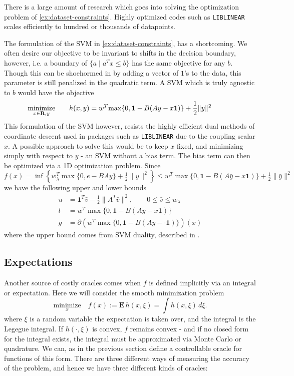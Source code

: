 \begin{example} There is a large amount of research
which goes into solving the optimization problem of \eqref{ex:dataset-constraints}.
Highly optimized codes such as {\tt LIBLINEAR} \cite{REF08a} scales efficiently to hundred or thousands of
datapoints. 

The formulation of the SVM in  \eqref{ex:dataset-constraints}, has a shortcoming.
We often desire our objective to be invariant to shifts in the
decision boundary, however, i.e. a boundary of $\{ a \mid a^Tx \leq b \}$ has the same
objective for any $b$. Though this can be shoehormed in by adding a vector of $1$'s to the data, 
this parameter is still penalized in the quadratic term. A SVM which is truly agnostic
to $b$ would have the objective
$$
\underset{x\in \mathbf{R} ,y}{\mbox{minimize}}\qquad h(x,y) = w^{T}\!\max\{0,\mathbf{1}-B(Ay - x\mathbf{1})\}+\frac{1}{2}\|y\|^{2}
\qquad \quad$$
This formulation of the SVM however, resists the highly efficient dual methods
of coordinate descent used in packages such as {\tt LIBLINEAR} \cite{REF08a}
due to the coupling scalar $x$. A possible approach to solve this
would be to keep $x$ fixed, and minimizing simply with respect to $y$ - an SVM
without a bias term. The bias term can then be optimized via a 1D optimization
problem. Since
$$
f(x)=\inf\left\{ w_{\lambda}^{T}\max\{0,e-BAy\}+\tfrac{1}{2}\|y\|^{2}\right\} \leq w^{T}\!\max\{0,\mathbf{1}-B(A\bar{y}-x\mathbf{1})\}+\tfrac{1}{2}\|\bar{y}\|^{2}
$$
we have the following upper and lower bounds
\begin{align*}
u & =\mathbf{1}^{T}\bar{v}-\tfrac{1}{2}\|A^{T}\bar{v}\|^{2},\qquad0\leq\bar{{v}}\leq w_{\lambda}\\
l & =w^{T}\!\max\{0,\mathbf{1}-B(A\bar{y}-x\mathbf{1})\}\\
g & =\partial(w^{T}\!\max\{0,\mathbf{1}-B(A\bar{y}-\cdot\mathbf{1})\})(x)
\end{align*}
where the upper bound comes from SVM duality, described in .

\end{example}
 

\subsection{Expectations}
Another source of costly oracles comes when $f$ is defined
implicitly via an integral or expectation. Here we will consider the smooth 
minimization problem
$$
\underset{x}{\mbox{minimize}}\quad f(x) :=\mathbf{E}\,h(x,\xi) = \int \! h(x,\xi) \,d\xi .
$$
where $\xi$ is a random variable the expectation is taken over, and the
integral is the Legegue integral. If $h(\cdot, \xi)$ is convex, $f$ remains
convex - and if no closed form for the integral exists, the integral must be
approximated via Monte Carlo or quadrature. We can, as in the previous section
define  a controllable oracle for functions of this form. There are three
different ways of measuring the accuracy of the problem, and hence we have
three different kinds of oracles:

